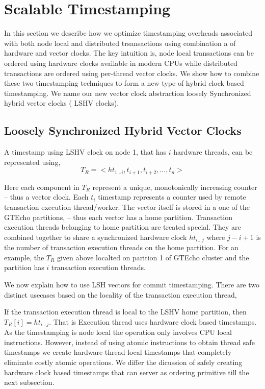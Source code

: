 \section{Scalable Timestamping}

In this section we describe how we optimize timestamping overheads
associated with both node local and distributed trsansactions using combination
a of hardware and vector clocks. The key intuition is, node local transactions
can be ordered using hardware clocks available in modern CPUs while distributed 
transactions are ordered using per-thread vector clocks. We show how to combine these
two timestamping techniques to form a new type of hybrid clock based timestamping. 
We name our new vector clock abstraction loosely Synchronized hybrid vector clocks ( LSHV clocks).

\subsection{Loosely Synchronized Hybrid Vector Clocks}

A timestamp using LSHV clock on node 1, that has $i$ hardware threads, can be represented using,
\[T_R = <ht_{1...i},t_{i+1}, t_{i+2}, ..., t_n>\]

Here each component in $T_R$ represent a unique, monotonically increasing counter -- thus a vector
clock. Each $t_i$ timestamp represents a counter used by remote transaction execution thread/worker.
The vector itself is stored in a one of the GTEcho partitions, -- thus each vector has a home partition.
Transaction execution threads belonging to home partition are treated special. They are combined together
to share a synchronized hardware clock $ht_{i...j}$ where $j - i + 1$ is the number of transaction execution
threads on the home partition. For an example, the $T_R$ given above localted on parition 1 of GTEcho
cluster and the partition has $i$ transaction execution threads.

We now explain how to use LSH vectors for commit timestamping. There are two distinct usecases based on the
locality of the transaction execution thread,

If the transaction execution thread is local to the LSHV home partition, then $T_R[i] = ht_{i...j}$. That is 
Execution thread uses hardware clock based timestamps. As the timestamping is node local the
operation only involves CPU local instructions. However, instead of using atomic instructions to 
obtain thread safe timestamps we create hardware thread local timestamps that completely eliminate 
costly atomic operations. We differ the dicussion of safely creating hardware clock based timestamps
that can server as ordering primitive till the next subsection.

